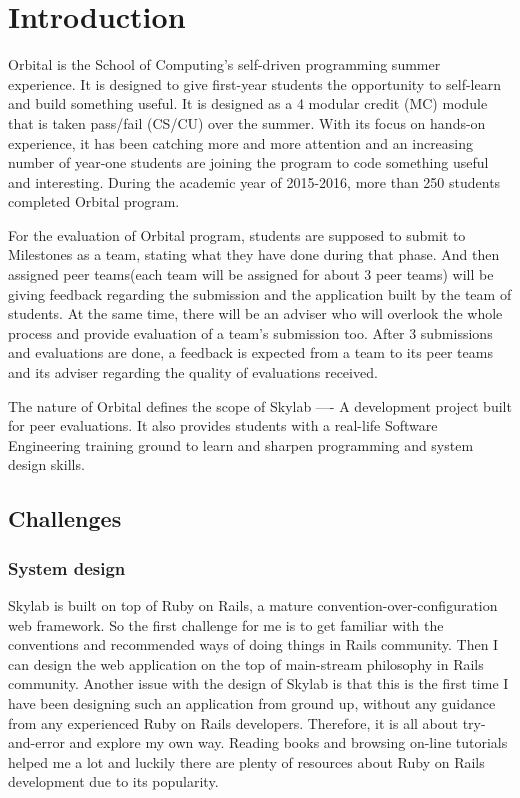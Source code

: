 \chapter{Introduction}

Orbital is the School of Computing’s self-driven programming summer experience. It is designed to give first-year students the opportunity to self-learn and build something useful. It is designed as a 4 modular credit (MC) module that is taken pass/fail (CS/CU) over the summer. With its focus on hands-on experience, it has been catching more and more attention and an increasing number of year-one students are joining the program to code something useful and interesting. During the academic year of 2015-2016, more than 250 students completed Orbital program.

For the evaluation of Orbital program, students are supposed to submit to Milestones as a team, stating what they have done during that phase. And then assigned peer teams(each team will be assigned for about 3 peer teams) will be giving feedback regarding the submission and the application built by the team of students. At the same time, there will be an adviser who will overlook the whole process and provide evaluation of a team's submission too. After 3 submissions and evaluations are done, a feedback is expected from a team to its peer teams and its adviser regarding the quality of evaluations received.

The nature of Orbital defines the scope of Skylab —- A development project built for peer evaluations. It also provides students with a real-life Software Engineering training ground to learn and sharpen programming and system design skills. 

\section{Challenges}

\subsection{System design}
Skylab is built on top of Ruby on Rails, a mature convention-over-configuration web framework. So the first challenge for me is to get familiar with the conventions and recommended ways of doing things in Rails community. Then I can design the web application on the top of main-stream philosophy in Rails community. Another issue with the design of Skylab is that this is the first time I have been designing such an application from ground up, without any guidance from any experienced Ruby on Rails developers. Therefore, it is all about try-and-error and explore my own way. Reading books and browsing on-line tutorials helped me a lot and luckily there are plenty of resources about Ruby on Rails development due to its popularity.


